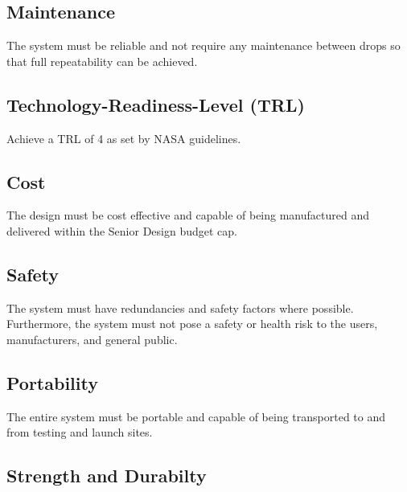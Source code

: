 \subsection{Maintenance}

\indent\indent The system must be reliable and not require any maintenance between drops so that full repeatability can be achieved. 


\subsection{Technology-Readiness-Level (TRL)}

\indent\indent Achieve a TRL of 4 as set by NASA guidelines.


\subsection{Cost}

\indent\indent The design must be cost effective and capable of being manufactured and delivered within the Senior Design budget cap. 


\subsection{Safety}

\indent\indent The system must have redundancies and safety factors where possible. Furthermore, the system must not pose a safety or health risk to the users, manufacturers, and general public. 


\subsection{Portability}

\indent\indent The entire system must be portable and capable of being transported to and from testing and launch sites.


\subsection{Strength and Durabilty}

